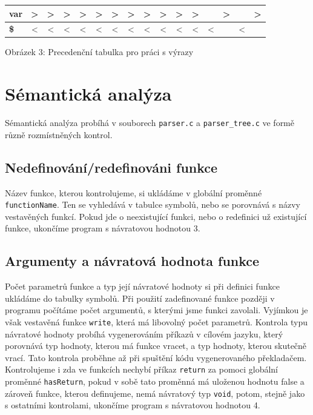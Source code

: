 \documentclass[11pt,a4paper]{article}
\renewcommand{\familydefault}{\sfdefault}
\begin{document}
\begin{table}[H]
{\begin{tabular}{|l|c|c|c|c|c|c|c|c|c|c|c|c|c|c|c|}
			\textbf{var}             & \textgreater{} & \textgreater{} & \textgreater{} & \textgreater{} & \textgreater{} & \textgreater{}       & \textgreater{}          & \textgreater{}        & \textgreater{}           & \textgreater{} & \textgreater{} &             & \textgreater{} &             & \textgreater{} \\ \hline
			\textbf{\$}              & \textless{}    & \textless{}    & \textless{}    & \textless{}    & \textless{}    & \textless{}          & \textless{}             & \textless{}           & \textless{}              & \textless{}    & \textless{}    & \textless{} &                & \textless{} &                \\ \hline
		\end{tabular}}
	    
\end{table}
\renewcommand{\familydefault}{\sfdefault}
\begin{center}
	\caption{Obrázek 3: Precedenční tabulka pro práci s výrazy}
\end{center}

\pagebreak{}

\section{Sémantická analýza}
Sémantická analýza probíhá v souborech \verb|parser.c| a \verb|parser_tree.c| ve formě různě rozmístněných kontrol. 
\subsection{Nedefinování/redefinováni funkce}
Název funkce, kterou kontrolujeme, si ukládáme v globální proměnné \verb|functionName|. Ten se vyhledává v tabulce symbolů, nebo se porovnává s názvy vestavěných funkcí. Pokud jde o neexistující funkci, nebo o redefinici už existující funkce, ukončíme program s návratovou hodnotou 3.
\subsection{Argumenty a návratová hodnota funkce}
Počet parametrů funkce a typ její návratové hodnoty si při definici funkce ukládáme do tabulky symbolů. Při použití zadefinované funkce později v programu počítáme počet argumentů, s kterými jsme funkci zavolali.  Vyjímkou je však vestavěná funkce \verb|write|, která má libovolný počet parametrů. Kontrola typu návratové hodnoty probíhá vygenerováním příkazů v cílovém jazyku, který porovnává typ hodnoty, kterou má funkce vracet, a typ hodnoty, kterou skutečně vrací. Tato kontrola proběhne až při spuštění kódu vygenerovaného překladačem. Kontrolujeme i zda ve funkcích nechybí příkaz \verb|return| za pomoci globální proměnné \verb|hasReturn|, pokud v sobě tato proměnná má uloženou hodnotu false a zároveň funkce, kterou definujeme, nemá návratový typ \verb|void|, potom, stejně jako s ostatními kontrolami, ukončíme program s návratovou hodnotou 4.
\end{document}
